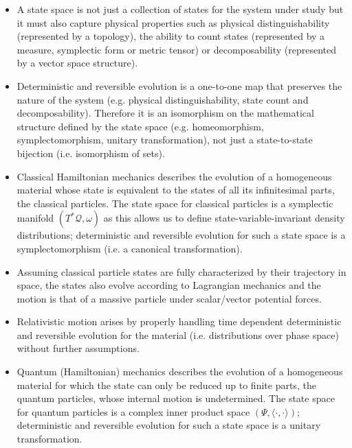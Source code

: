 \documentclass[smallextended]{svjour3}
\numberwithin{equation}{section}
\begin{document}
\begin{itemize}

\item A state space is not just a collection of states for the system under study but it must also capture physical properties such as physical distinguishability (represented by a topology), the ability to count states (represented by a measure, symplectic form or metric tensor) or decomposability (represented by a vector space structure).

\item Deterministic and reversible evolution is a one-to-one map that preserves the nature of the system (e.g. physical distinguishability, state count and decomposability). Therefore it is an isomorphism on the mathematical structure defined by the state space (e.g. homeomorphism, symplectomorphism, unitary transformation), not just a state-to-state bijection (i.e. isomorphism of sets).

\item Classical Hamiltonian mechanics describes the evolution of a homogeneous material whose state is equivalent to the states of all its infinitesimal parts, the classical particles. The state space for classical particles is a symplectic manifold $(T^*\mathcal{Q}, \omega)$ as this allows us to define state-variable-invariant density distributions; deterministic and reversible evolution for such a state space is a symplectomorphism (i.e. a canonical transformation).

\item Assuming classical particle states are fully characterized by their trajectory in space, the states also evolve according to Lagrangian mechanics and the motion is that of a massive particle under scalar/vector potential forces.

\item Relativistic motion arises by properly handling time dependent deterministic and reversible evolution for the material (i.e. distributions over phase space) without further assumptions.

\item Quantum (Hamiltonian) mechanics describes the evolution of a homogeneous material for which the state can only be reduced up to finite parts, the quantum particles, whose internal motion is undetermined. The state space for quantum particles is a complex inner product space $(\Psi, \langle \cdot , \cdot \rangle)$; deterministic and reversible evolution for such a state space is a unitary transformation.
\end{itemize}
\end{document}
